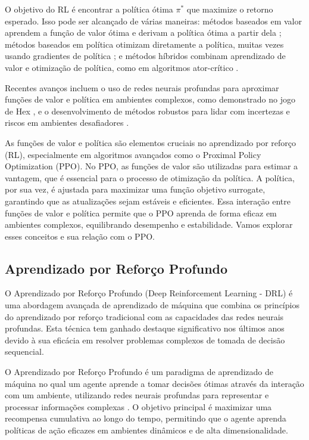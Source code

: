 O objetivo do RL é encontrar a política ótima \(\pi^*\) que maximize o retorno esperado. Isso pode ser alcançado de várias maneiras: métodos baseados em valor aprendem a função de valor ótima e derivam a política ótima a partir dela \cite{54807143779fa04466a0b0d01f4d1ecc94eb39ae}; métodos baseados em política otimizam diretamente a política, muitas vezes usando gradientes de política \cite{0fe19b1631b60807bffb7757865b184d797c3016}; e métodos híbridos combinam aprendizado de valor e otimização de política, como em algoritmos ator-crítico \cite{1911.04094}.

Recentes avanços incluem o uso de redes neurais profundas para aproximar funções de valor e política em ambientes complexos, como demonstrado no jogo de Hex \cite{54807143779fa04466a0b0d01f4d1ecc94eb39ae}, e o desenvolvimento de métodos robustos para lidar com incertezas e riscos em ambientes desafiadores \cite{2312.00342}.

As funções de valor e política são elementos cruciais no aprendizado por reforço (RL), especialmente em algoritmos avançados como o Proximal Policy Optimization (PPO). No PPO, as funções de valor são utilizadas para estimar a vantagem, que é essencial para o processo de otimização da política. A política, por sua vez, é ajustada para maximizar uma função objetivo surrogate, garantindo que as atualizações sejam estáveis e eficientes. Essa interação entre funções de valor e política permite que o PPO aprenda de forma eficaz em ambientes complexos, equilibrando desempenho e estabilidade. Vamos explorar esses conceitos e sua relação com o PPO.


\subsection{Aprendizado por Reforço Profundo}
\label{subsec:deep_rl}

O Aprendizado por Reforço Profundo (Deep Reinforcement Learning - DRL) é uma abordagem avançada de aprendizado de máquina que combina os princípios do aprendizado por reforço tradicional com as capacidades das redes neurais profundas. Esta técnica tem ganhado destaque significativo nos últimos anos devido à sua eficácia em resolver problemas complexos de tomada de decisão sequencial.

O Aprendizado por Reforço Profundo é um paradigma de aprendizado de máquina no qual um agente aprende a tomar decisões ótimas através da interação com um ambiente, utilizando redes neurais profundas para representar e processar informações complexas \cite{https://www.semanticscholar.org/paper/3879ab51e5eea7ce06dc31edbb169afb76e0bd71,https://www.semanticscholar.org/paper/45ae19e1e9037e10e90423b536eb183dcd99bd2e}. O objetivo principal é maximizar uma recompensa cumulativa ao longo do tempo, permitindo que o agente aprenda políticas de ação eficazes em ambientes dinâmicos e de alta dimensionalidade.

